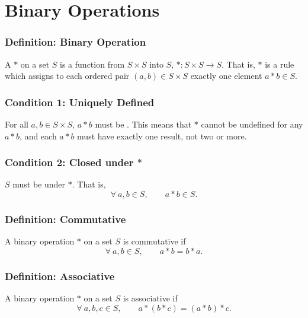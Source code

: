 \section{Binary Operations}

\subsubsection*{Definition: Binary Operation}
A  $*$ on a set $S$ is a function from $S \times S$ into $S$, $*: S \times S \rightarrow S$. That is, $*$ is a rule which assigns to each ordered pair $(a,b) \in S \times S$ exactly one element $a * b \in S$.

\subsubsection*{Condition 1: Uniquely Defined}
For all $a,b \in S \times S$, $a * b$ must be . This means that $*$ cannot be undefined for any $a * b$, and each $a * b$ must have exactly one result, not two or more.

\subsubsection*{Condition 2: Closed under $*$}
$S$ must be  under $*$. That is,
\[
    \forall~ a,b \in S, \qquad a * b \in S.
\]

\subsubsection*{Definition: Commutative}
A binary operation $*$ on a set $S$ is commutative if
\[
    \forall~ a,b \in S, \qquad a * b = b * a.
\]

\subsubsection*{Definition: Associative}
A binary operation $*$ on a set $S$ is associative if
\[
    \forall~ a,b,c \in S, \qquad a * (b * c) = (a * b) * c.
\]
